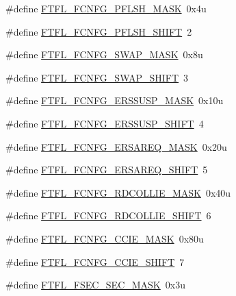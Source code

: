 \begin{DoxyCompactItemize}
\#define \hyperlink{group___f_t_f_l___register___masks_gab69a16e2bdad743bcb6ef431e8280d71}{F\+T\+F\+L\+\_\+\+F\+C\+N\+F\+G\+\_\+\+P\+F\+L\+S\+H\+\_\+\+M\+A\+SK}~0x4u
\item 
\#define \hyperlink{group___f_t_f_l___register___masks_gafe9d7f1b93cfee80364f32ef3bb71847}{F\+T\+F\+L\+\_\+\+F\+C\+N\+F\+G\+\_\+\+P\+F\+L\+S\+H\+\_\+\+S\+H\+I\+FT}~2
\item 
\#define \hyperlink{group___f_t_f_l___register___masks_gad0e9c77377c1ce86034ae64293617b62}{F\+T\+F\+L\+\_\+\+F\+C\+N\+F\+G\+\_\+\+S\+W\+A\+P\+\_\+\+M\+A\+SK}~0x8u
\item 
\#define \hyperlink{group___f_t_f_l___register___masks_gac9073c0a54af442456b0e5f72f1049ed}{F\+T\+F\+L\+\_\+\+F\+C\+N\+F\+G\+\_\+\+S\+W\+A\+P\+\_\+\+S\+H\+I\+FT}~3
\item 
\#define \hyperlink{group___f_t_f_l___register___masks_gae512d6243ccce7b518cadd264079490b}{F\+T\+F\+L\+\_\+\+F\+C\+N\+F\+G\+\_\+\+E\+R\+S\+S\+U\+S\+P\+\_\+\+M\+A\+SK}~0x10u
\item 
\#define \hyperlink{group___f_t_f_l___register___masks_ga2968029948ad75424c9840d912fe0a2f}{F\+T\+F\+L\+\_\+\+F\+C\+N\+F\+G\+\_\+\+E\+R\+S\+S\+U\+S\+P\+\_\+\+S\+H\+I\+FT}~4
\item 
\#define \hyperlink{group___f_t_f_l___register___masks_ga1232c8e74318df0071238dbaca28f52f}{F\+T\+F\+L\+\_\+\+F\+C\+N\+F\+G\+\_\+\+E\+R\+S\+A\+R\+E\+Q\+\_\+\+M\+A\+SK}~0x20u
\item 
\#define \hyperlink{group___f_t_f_l___register___masks_gae253a51bdaf93fffd9d63bf230bd1aa7}{F\+T\+F\+L\+\_\+\+F\+C\+N\+F\+G\+\_\+\+E\+R\+S\+A\+R\+E\+Q\+\_\+\+S\+H\+I\+FT}~5
\item 
\#define \hyperlink{group___f_t_f_l___register___masks_ga510a9cceeec010a1b628e72a66faf142}{F\+T\+F\+L\+\_\+\+F\+C\+N\+F\+G\+\_\+\+R\+D\+C\+O\+L\+L\+I\+E\+\_\+\+M\+A\+SK}~0x40u
\item 
\#define \hyperlink{group___f_t_f_l___register___masks_gab1632db5bed20c53367fabd03f3dbf30}{F\+T\+F\+L\+\_\+\+F\+C\+N\+F\+G\+\_\+\+R\+D\+C\+O\+L\+L\+I\+E\+\_\+\+S\+H\+I\+FT}~6
\item 
\#define \hyperlink{group___f_t_f_l___register___masks_ga83295213a4020ff039f039f13e7353c5}{F\+T\+F\+L\+\_\+\+F\+C\+N\+F\+G\+\_\+\+C\+C\+I\+E\+\_\+\+M\+A\+SK}~0x80u
\item 
\#define \hyperlink{group___f_t_f_l___register___masks_ga16393b0217b60ede6ab76a77af77ecff}{F\+T\+F\+L\+\_\+\+F\+C\+N\+F\+G\+\_\+\+C\+C\+I\+E\+\_\+\+S\+H\+I\+FT}~7
\item 
\#define \hyperlink{group___f_t_f_l___register___masks_ga0f4601a13f1fb12d6f8485c7f4365498}{F\+T\+F\+L\+\_\+\+F\+S\+E\+C\+\_\+\+S\+E\+C\+\_\+\+M\+A\+SK}~0x3u

\end{DoxyCompactItemize}
